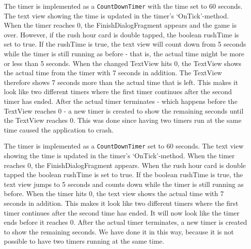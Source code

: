 \newpage
The timer is implemented as a \verb|CountDownTimer| with the time set to 60 seconds. The text view showing the time is updated in the timer’s ‘OnTick’-method.  When the timer reaches 0, the FinishDialogFragment appears and the game is over. However, if the rush hour card is double tapped, the boolean rushTime is set to true. If the rushTime is true, the text view will count down from 5 seconds while the timer is still running as before -  that is, the actual time might be more or less than 5 seconds. When the changed TextView hits 0, the TextView shows the actual time from the timer with 7 seconds in addition. The TextView therefore shows 7 seconds more than the actual time that is left. This makes it look like two different timers where the first timer continues after the second timer has ended. After the actual timer terminates - which happens before the TextView reaches 0 - a new timer is created to show the remaining seconds until the TextView reaches 0. This was done since having two timers run at the same time caused the application to crash.  

The timer is implemented as a \verb|CountDownTimer| set to 60 seconds. The text view showing the time is updated in the timer’s ‘OnTick’-method.  When the timer reaches 0, the FinishDialogFragment appears. When the rush hour card is double tapped the boolean rushTime is set to true. If the boolean rushTime is true, the text view jumps to 5 seconds and counts down while the timer is still running as before. When the timer hits 0, the text view shows the actual time with 7 seconds in addition. This makes it look like two different timers where the first timer continues after the second time has ended.  It will now look like the timer ends before it reaches 0. After the actual timer terminates, a new timer is created to show the remaining seconds. We have done it in this way, because it is not possible to have two timers running at the same time. 


